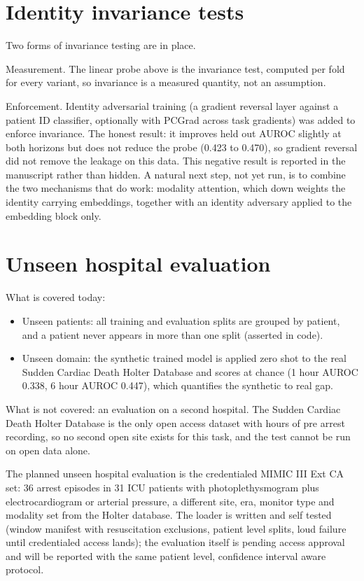 \documentclass[11pt]{article}
\begin{document}
\section{Identity invariance tests}
Two forms of invariance testing are in place.

Measurement. The linear probe above is the invariance test, computed per fold
for every variant, so invariance is a measured quantity, not an assumption.

Enforcement. Identity adversarial training (a gradient reversal layer against
a patient ID classifier, optionally with PCGrad across task gradients) was
added to enforce invariance. The honest result: it improves held out AUROC
slightly at both horizons but does not reduce the probe (0.423 to 0.470), so
gradient reversal did not remove the leakage on this data. This negative
result is reported in the manuscript rather than hidden. A natural next step,
not yet run, is to combine the two mechanisms that do work: modality
attention, which down weights the identity carrying embeddings, together with
an identity adversary applied to the embedding block only.

\section{Unseen hospital evaluation}
What is covered today:

\begin{itemize}
\item Unseen patients: all training and evaluation splits are grouped by
patient, and a patient never appears in more than one split (asserted in
code).
\item Unseen domain: the synthetic trained model is applied zero shot to the
real Sudden Cardiac Death Holter Database and scores at chance (1 hour AUROC
0.338, 6 hour AUROC 0.447), which quantifies the synthetic to real gap.
\end{itemize}

What is not covered: an evaluation on a second hospital. The Sudden Cardiac
Death Holter Database is the only open access dataset with hours of pre arrest
recording, so no second open site exists for this task, and the test cannot be
run on open data alone.

The planned unseen hospital evaluation is the credentialed MIMIC III Ext CA
set: 36 arrest episodes in 31 ICU patients with photoplethysmogram plus
electrocardiogram or arterial pressure, a different site, era, monitor type
and modality set from the Holter database. The loader is written and self
tested (window manifest with resuscitation exclusions, patient level splits,
loud failure until credentialed access lands); the evaluation itself is
pending access approval and will be reported with the same patient level,
confidence interval aware protocol.
\end{document}
